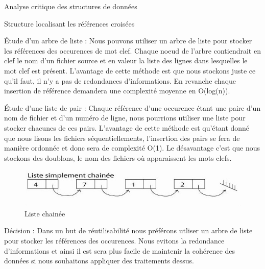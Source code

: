 \documentclass{article}
\begin{document}
\begin{section}{Analyse critique des structures de données}
\begin{subsection}{Structure localisant les références croisées}
    \begin{paragraph}{Étude d'un arbre de liste :}
    Nous pouvons utiliser un arbre de liste pour stocker les références des occurences de mot clef. Chaque noeud de l'arbre contiendrait en clef le nom d'un fichier source
    et en valeur la liste des lignes dans lesquelles le mot clef est présent. L'avantage de cette méthode est que nous stockons juste ce qu'il faut, il n'y a pas de redondances
    d'informations. En revanche chaque insertion de référence demandera une complexité moyenne en O(log(n)).
  
    \end{paragraph}
    
    \begin{paragraph}{Étude d'une liste de pair :}
      Chaque référence d'une occurence étant une paire d'un nom de fichier et d'un numéro de ligne, nous pourrions utiliser une liste pour stocker chacunes de ces pairs.
      L'avantage de cette méthode est qu'étant donné que nous lisons les fichiers séquentiellements, l'insertion des pairs se fera de manière ordonnée et donc sera de complexité O(1).
      Le désavantage c'est que nous stockons des doublons, le nom des fichiers où apparaissent les mots clefs.
  
        \begin{figure}[htp]
    \centering
    \includegraphics[scale=0.5]{images/liste.jpg}
    \caption{Liste chainée}
    \end{figure}
    \end{paragraph}
      \FloatBarrier

    \begin{paragraph}{Décision :}
      Dans un but de réutilisabilité nous préférons utliser un arbre de liste pour stocker les références des occurences. Nous evitons la redondance d'informations
      et ainsi il est sera plus facile de maintenir la cohérence des données si nous souhaitons appliquer des traitements dessus.
    \end{paragraph}
    
  \end{subsection}

\end{section}
\end{document}
